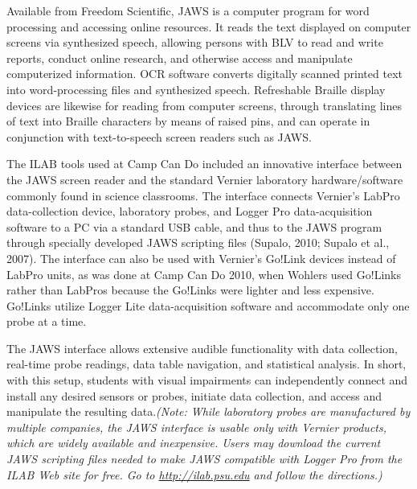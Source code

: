 \documentclass[11.5pt]{sig-alternate} %
\begin{document}
\begin{large}
Available from Freedom Scientific, JAWS is a computer program for word processing and accessing online resources. It reads the text displayed on computer screens via synthesized speech, allowing persons with BLV to read and write reports, conduct online research, and otherwise access and manipulate computerized information. OCR software converts digitally scanned printed text into word-processing files and synthesized speech. Refreshable Braille display devices are likewise for reading from computer screens, through translating lines of text into Braille characters by means of raised pins, and can operate in conjunction with text-to-speech screen readers such as JAWS.

The ILAB tools used at Camp Can Do included an innovative interface between the JAWS screen reader and the standard Vernier laboratory hardware/software commonly found in science classrooms. The interface connects Vernier’s LabPro data-collection device, laboratory probes, and Logger Pro data-acquisition software to a PC via a standard USB cable, and thus to the JAWS program through specially developed JAWS scripting files (Supalo, 2010; Supalo et al., 2007). The interface can also be used with Vernier’s Go!Link devices instead of LabPro units, as was done at Camp Can Do 2010, when Wohlers used Go!Links rather than LabPros because the Go!Links were lighter and less expensive. Go!Links utilize Logger Lite data-acquisition software and accommodate only one probe at a time.

The JAWS interface allows extensive audible functionality with data collection, real-time probe readings, data table navigation, and statistical analysis. In short, with this setup, students with visual impairments can independently connect and install any desired sensors or probes, initiate data collection, and access and manipulate the resulting data.\textit{(Note: While laboratory probes are manufactured by multiple companies, the JAWS interface is usable only with Vernier products, which are widely available and inexpensive. Users may download the current JAWS scripting files needed to make JAWS compatible with Logger Pro from the ILAB Web site for free. Go to \url{http://ilab.psu.edu} and follow the directions.)}


\end{large}
\end{document}
